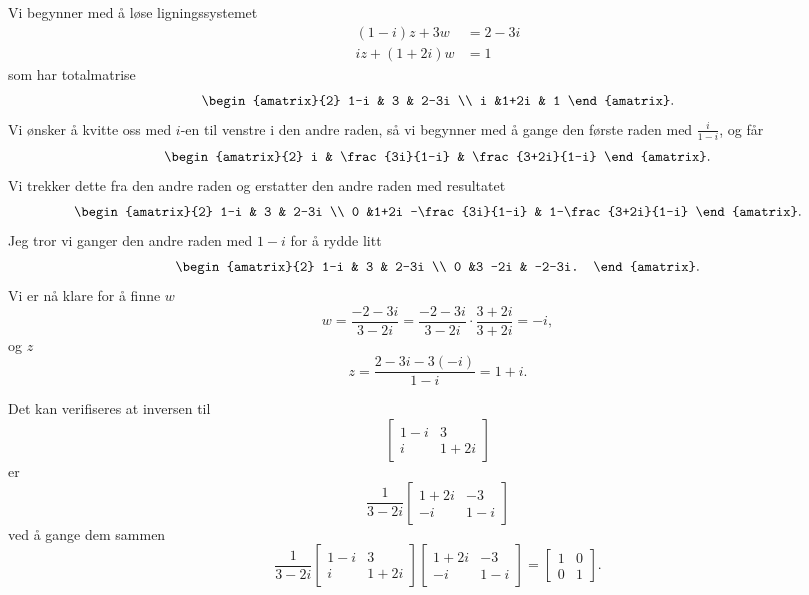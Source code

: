 \begin{ex}
Vi begynner med å løse ligningssystemet
\begin{align*}
(1-i) z + 3w   &= 2-3i \\
i z + (1+2i) w &= 1
\end{align*}
som har totalmatrise
\[
\begin{amatrix}{2}
1-i & 3 & 2-3i \\ i &1+2i & 1
\end{amatrix}.
\]
Vi ønsker å kvitte oss med $i$-en til venstre i den andre raden, så vi begynner med å gange den første raden med $\frac{i}{1-i}$, og får
\[
\begin{amatrix}{2}
i & \frac{3i}{1-i} & \frac{3+2i}{1-i} 
\end{amatrix}.
\]
Vi trekker dette fra den andre raden og erstatter den andre raden med resultatet
\[
\begin{amatrix}{2}
1-i & 3 & 2-3i \\ 0 &1+2i -\frac{3i}{1-i} & 1-\frac{3+2i}{1-i} 
\end{amatrix}.
\]
Jeg tror vi ganger den andre raden med $1-i$ for å rydde litt
\[
\begin{amatrix}{2}
1-i & 3 & 2-3i \\ 0 &3 -2i  & -2-3i.
\end{amatrix}.
\]
Vi er nå klare for å finne $w$
\[
w=\frac{-2-3i}{3-2i}=\frac{-2-3i}{3-2i}\cdot \frac{3+2i}{3+2i}=-i,
\]
og $z$
\[
z=\frac{2-3i-3(-i)}{1-i}=1+i.
\]
\end{ex}

\begin{ex}
Det kan verifiseres at inversen til 
\[
\begin{bmatrix}
1-i & 3  \\ i &1+2i 
\end{bmatrix}
\]
er
\[
\frac{1}{3-2i}
\begin{bmatrix}
1+2i & -3  \\ -i &1-i 
\end{bmatrix}
\]
ved å gange dem sammen
\[
\frac{1}{3-2i}
\begin{bmatrix}
1-i & 3  \\ i &1+2i 
\end{bmatrix}
\begin{bmatrix}
1+2i & -3  \\ -i &1-i 
\end{bmatrix}
=
\begin{bmatrix}
1 & 0  \\ 0 &1 
\end{bmatrix}.
\]


\end{ex}

